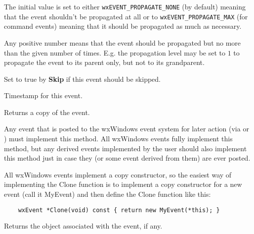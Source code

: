 The initial value is set to either {\tt wxEVENT\_PROPAGATE\_NONE} (by
default) meaning that the event shouldn't be propagated at all or to 
{\tt wxEVENT\_PROPAGATE\_MAX} (for command events) meaning that it should be
propagated as much as necessary.

Any positive number means that the event should be propagated but no more than
the given number of times. E.g. the propagation level may be set to $1$ to
propagate the event to its parent only, but not to its grandparent.



Set to true by {\bf Skip} if this event should be skipped.



Timestamp for this event.

\label{wxeventclone}


Returns a copy of the event.

Any event that is posted to the wxWindows event system for later action (via
 or
) must implement this method. All wxWindows
events fully implement this method, but any derived events implemented by the
user should also implement this method just in case they (or some event
derived from them) are ever posted.

All wxWindows events implement a copy constructor, so the easiest way of
implementing the Clone function is to implement a copy constructor for
a new event (call it MyEvent) and then define the Clone function like this:

\begin{verbatim}
    wxEvent *Clone(void) const { return new MyEvent(*this); }
\end{verbatim}



Returns the object associated with the
event, if any.




